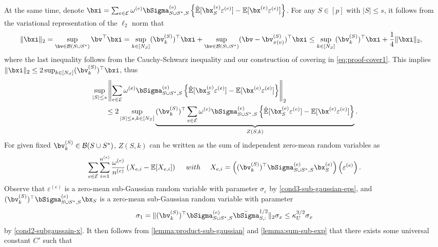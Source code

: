 \documentclass[10pt]{article}
\numberwithin{equation}{section}
\begin{document}
At the same time, denote $\bxi = \sum_{e\in \mathcal{E}} \omega^{(e)} \bSigma^{(e)}_{S\cup S^*,S} \left\{\hat{\mathbb{E}}[\bx_S^{(e)} \varepsilon^{(e)}] - \mathbb{E}[\bx^{(e)} \varepsilon^{(e)}]\right\}$. For any $S\in [p]$ with $|S| \le s$, it follows from the variational representation of the $\ell_2$ norm that
\begin{align*}
\|\bxi\|_2 &= \sup_{\bv \in \mathcal{B}(S \cup S^*)} \bv^\top \bxi = \sup_{k \in [N_S]} (\bv_k^{(S)})^\top \bxi + \sup_{\bv \in \mathcal{B}(S\cup S^*)} (\bv - \bv_{\pi(v)}^{(S)})^\top \bxi \le \sup_{k \in [N_S]} (\bv_k^{(S)})^\top \bxi + \frac{1}{4}\|\bxi\|_2,
\end{align*} where the last inequality follows from the Cauchy-Schwarz inequality and our construction of covering in \eqref{eq:proof-cover1}. This implies $\|\bxi\|_2 \le 2 \sup_{k \in [N_S]} (\bv_k^{(S)})^\top \bxi$, thus
\begin{align}
\label{eq:proof-sup1}
\begin{split}
	&\sup_{|S| \le s} \left\|\sum_{e\in \mathcal{E}} \omega^{(e)} \bSigma^{(e)}_{S\cup S^*,S} \left\{\hat{\mathbb{E}}[\bx_S^{(e)} \varepsilon^{(e)}] - \mathbb{E}[\bx^{(e)} \varepsilon^{(e)}]\right\}\right\|_2  \\
	&~~~~~~ \le 2 \sup_{|S|\le s, k\in [N_S]} \underbrace{(\bv_{k}^{(S)})^\top \sum_{e\in \mathcal{E}} \omega^{(e)} \bSigma^{(e)}_{S\cup S^*,S} \left\{\hat{\mathbb{E}}[\bx_S^{(e)} \varepsilon^{(e)}] - \mathbb{E}[\bx^{(e)} \varepsilon^{(e)}]\right\}}_{Z(S,k)}. 
\end{split}
\end{align} 
For given fixed $\bv_k^{(S)} \in \mathcal{B}(S\cup S^*)$, $Z(S,k)$ can be written as the sum of independent zero-mean random variables as
\begin{align*}
	\sum_{e\in \mathcal{E}} \sum_{i=1}^{n^{(e)}} \frac{\omega^{(e)}}{n^{(e)}}\left(X_{e,i} - \mathbb{E}[X_{e,i}] \right) ~~~~ with ~~~~ X_{e,i} = \left((\bv^{(S)}_k)^\top \bSigma^{(e)}_{S\cup S^*,S} \bx_S^{(e)}\right) \left( \varepsilon^{(e)} \right).
\end{align*} Observe that $\varepsilon^{(e)}$ is a zero-mean sub-Gaussian random variable with parameter $\sigma_\varepsilon$ by \cref{cond3-sub-gaussian-eps}, and $(\bv^{(S)}_k)^\top \bSigma^{(e)}_{S\cup S^*, S}\bx_{S}$ is a zero-mean sub-Gaussian random variable with parameter 
\begin{align*}
	\sigma_1 = \|(\bv_{k}^{(S)})^\top \bSigma^{(e)}_{S\cup S^*, S} \bar{\bSigma}_{S,:}^{1/2} \|_2 \sigma_x \le \kappa_U^{3/2} \sigma_x
\end{align*} by \cref{cond2-subgaussain-x}. It then follows from \cref{lemma:product-sub-gaussian} and \cref{lemma:sum-sub-exp} that there exists some universal constant $C'$ such that
\end{document}
